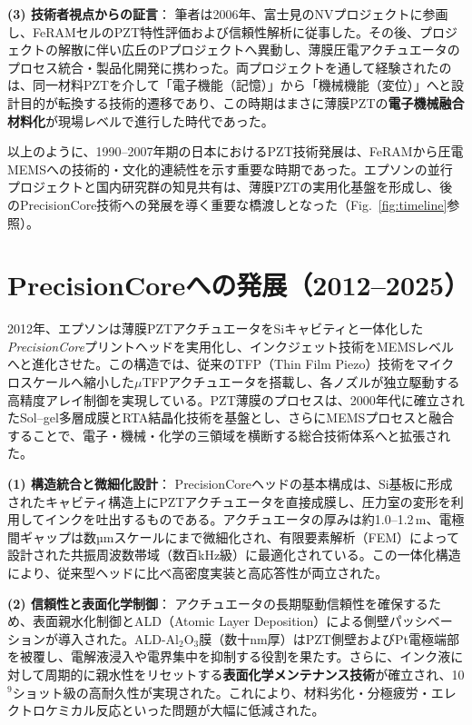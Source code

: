 \documentclass[conference]{IEEEtran}
\begin{document}
\medskip
\noindent
\textbf{(3) 技術者視点からの証言}：
筆者は2006年、富士見のNVプロジェクトに参画し、FeRAMセルのPZT特性評価および信頼性解析に従事した。その後、プロジェクトの解散に伴い広丘のPプロジェクトへ異動し、薄膜圧電アクチュエータのプロセス統合・製品化開発に携わった。両プロジェクトを通して経験されたのは、同一材料PZTを介して「電子機能（記憶）」から「機械機能（変位）」へと設計目的が転換する技術的遷移であり、この時期はまさに薄膜PZTの\textbf{電子機械融合材料化}が現場レベルで進行した時代であった。

\medskip
以上のように、1990--2007年期の日本におけるPZT技術発展は、FeRAMから圧電MEMSへの技術的・文化的連続性を示す重要な時期であった。エプソンの並行プロジェクトと国内研究群の知見共有は、薄膜PZTの実用化基盤を形成し、後のPrecisionCore技術への発展を導く重要な橋渡しとなった（Fig.~\ref{fig:timeline}参照）。

\section{PrecisionCoreへの発展（2012--2025）}
2012年、エプソンは薄膜PZTアクチュエータをSiキャビティと一体化した\textit{PrecisionCore}プリントヘッドを実用化し、インクジェット技術をMEMSレベルへと進化させた\cite{uemura2014mems}。この構造では、従来のTFP（Thin Film Piezo）技術をマイクロスケールへ縮小した$\mu$TFPアクチュエータを搭載し、各ノズルが独立駆動する高精度アレイ制御を実現している。PZT薄膜のプロセスは、2000年代に確立されたSol--gel多層成膜とRTA結晶化技術を基盤とし、さらにMEMSプロセスと融合することで、電子・機械・化学の三領域を横断する総合技術体系へと拡張された。

\medskip
\noindent
\textbf{(1) 構造統合と微細化設計}：
PrecisionCoreヘッドの基本構成は、Si基板に形成されたキャビティ構造上にPZTアクチュエータを直接成膜し、圧力室の変形を利用してインクを吐出するものである。アクチュエータの厚みは約1.0--1.2\,\textmu m、電極間ギャップは数µmスケールにまで微細化され、有限要素解析（FEM）によって設計された共振周波数帯域（数百kHz級）に最適化されている。この一体化構造により、従来型ヘッドに比べ高密度実装と高応答性が両立された。

\medskip
\noindent
\textbf{(2) 信頼性と表面化学制御}：
アクチュエータの長期駆動信頼性を確保するため、表面親水化制御とALD（Atomic Layer Deposition）による側壁パッシベーションが導入された\cite{ishihara2016reliability}。ALD-Al$_2$O$_3$膜（数十nm厚）はPZT側壁およびPt電極端部を被覆し、電解液浸入や電界集中を抑制する役割を果たす。さらに、インク液に対して周期的に親水性をリセットする\textbf{表面化学メンテナンス技術}が確立され、10$^9$ショット級の高耐久性が実現された。これにより、材料劣化・分極疲労・エレクトロケミカル反応といった問題が大幅に低減された。
\end{document}
